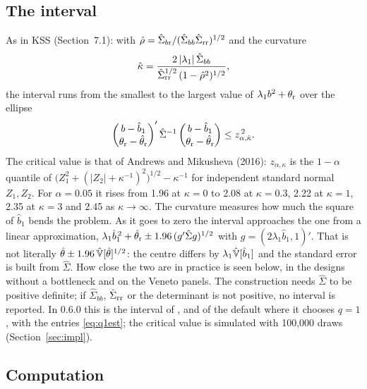 \subsection{The interval}\label{sec:q1int}

As in KSS (Section~7.1): with $\hat\rho=\hat\Sigma_{b{\rm r}}/(\hat\Sigma_{bb}\hat\Sigma_{\rm rr})^{1/2}$ and the
curvature
\begin{equation}\label{eq:kappa}
\hat\kappa=\frac{2\,|\lambda_1|\,\hat\Sigma_{bb}}{\hat\Sigma_{\rm rr}^{1/2}\,(1-\hat\rho^2)^{1/2}},
\end{equation}
the interval runs from the smallest to the largest value of $\lambda_1b^2+\theta_{\rm r}$ over the ellipse
\[
\begin{pmatrix}b-\hat b_1\\ \theta_{\rm r}-\hat\theta_{\rm r}\end{pmatrix}'\hat\Sigma^{-1}
\begin{pmatrix}b-\hat b_1\\ \theta_{\rm r}-\hat\theta_{\rm r}\end{pmatrix}\le z_{\alpha,\hat\kappa}^{\,2} .
\]
The critical value is that of Andrews and Mikusheva (2016): $z_{\alpha,\kappa}$ is the $1-\alpha$ quantile of
$\big(Z_1^2+(|Z_2|+\kappa^{-1})^2\big)^{1/2}-\kappa^{-1}$ for independent standard normal $Z_1,Z_2$. For
$\alpha=0.05$ it rises from 1.96 at $\kappa=0$ to 2.08 at $\kappa=0.3$, 2.22 at $\kappa=1$, 2.35 at $\kappa=3$ and
2.45 as $\kappa\to\infty$. The curvature measures how much the square of $\hat b_1$ bends the problem. As it
goes to zero the interval approaches the one from a linear approximation,
$\lambda_1\hat b_1^{\,2}+\hat\theta_{\rm r}\pm1.96\,(g'\hat\Sigma g)^{1/2}$ with $g=(2\lambda_1\hat b_1,1)'$. That is
not literally $\hat\theta\pm1.96\,\hat{\mathbb{V}}[\hat\theta]^{1/2}$: the centre differs by $\lambda_1\hat{\mathbb{V}}[\hat b_1]$ and the
standard error is built from $\hat\Sigma$. How close the two are in practice is seen below, in the designs
without a bottleneck and on the Veneto panels. The construction needs $\hat\Sigma$ to be positive definite; if
$\hat\Sigma_{bb}$, $\hat\Sigma_{\rm rr}$ or the determinant is not positive, no interval is reported. In \fevc{}
0.6.0 this is the interval of , and of the default where it chooses $q=1$, with the entries
\eqref{eq:q1est}; the critical value is simulated with 100{,}000 draws (Section~\ref{sec:impl}).

\subsection{Computation}

